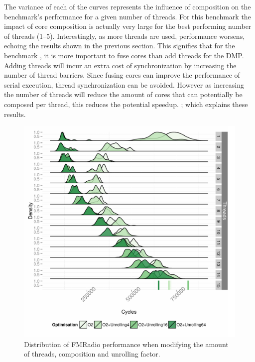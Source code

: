 The variance of each of the curves represents the influence of composition on the benchmark's performance for a given number of threads.
For this benchmark the impact of core composition is actually very large for the best performing number of threads (1--5).
Interestingly, as more threads are used, performance worsens, echoing the results shown in the previous section.
This signifies that for the benchmark , it is more important to fuse cores than add threads for the DMP.
Adding threads will incur an extra cost of synchronization by increasing the number of thread barriers.
Since fusing cores can improve the performance of serial execution, thread synchronization can be avoided. 
However as increasing the number of threads will reduce the amount of cores that can potentially be composed per thread, this reduces the potential speedup.
; which explains these results.

\begin{figure}
  \includegraphics[width=1\textwidth]{streamit-paper/graphics/unrolled_fm.pdf}
  \caption{Distribution of FMRadio performance when modifying the amount of threads, composition and unrolling factor.}\label{fig:fmunroll}
\end{figure}

